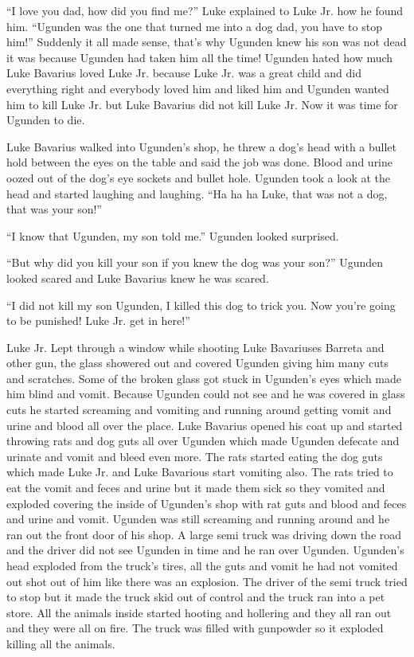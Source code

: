 ``I love you dad, how did you find me?'' Luke explained
to Luke Jr. how he found him. ``Ugunden was the one that
turned me into a dog dad, you have to stop him!'' Suddenly it
all made sense, that's why Ugunden knew his son was not dead it was
because Ugunden had taken him all the time! Ugunden hated how much
Luke Bavarius loved Luke Jr. because Luke Jr. was a great child and
did everything right and everybody loved him and liked him and
Ugunden wanted him to kill Luke Jr. but Luke Bavarius did not kill
Luke Jr. Now it was time for Ugunden to die.



Luke Bavarius walked into Ugunden's shop, he threw a dog's head
with a bullet hold between the eyes on the table and said the job
was done. Blood and urine oozed out of the dog's eye sockets and
bullet hole. Ugunden took a look at the head and started laughing
and laughing. ``Ha ha ha Luke, that was not a dog, that was
your son!''



``I know that Ugunden, my son told me.'' Ugunden looked
surprised.



``But why did you kill your son if you knew the dog was your
son?'' Ugunden looked scared and Luke Bavarius knew he was
scared.



``I did not kill my son Ugunden, I killed this dog to trick
you. Now you're going to be punished! Luke Jr. get in
here!''



Luke Jr. Lept through a window while shooting Luke Bavariuses
Barreta and other gun, the glass showered out and covered Ugunden
giving him many cuts and scratches. Some of the broken glass got
stuck in Ugunden's eyes which made him blind and vomit. Because
Ugunden could not see and he was covered in glass cuts he started
screaming and vomiting and running around getting vomit and urine
and blood all over the place. Luke Bavarius opened his coat up and
started throwing rats and dog guts all over Ugunden which made
Ugunden defecate and urinate and vomit and bleed even more. The
rats started eating the dog guts which made Luke Jr. and Luke
Bavarious start vomiting also. The rats tried to eat the vomit and
feces and urine but it made them sick so they vomited and exploded
covering the inside of Ugunden's shop with rat guts and blood and
feces and urine and vomit. Ugunden was still screaming and running
around and he ran out the front door of his shop. A large semi
truck was driving down the road and the driver did not see Ugunden
in time and he ran over Ugunden. Ugunden's head exploded from the
truck's tires, all the guts and vomit he had not vomited out shot
out of him like there was an explosion. The driver of the semi
truck tried to stop but it made the truck skid out of control and
the truck ran into a pet store. All the animals inside started
hooting and hollering and they all ran out and they were all on
fire. The truck was filled with gunpowder so it exploded killing
all the animals.



